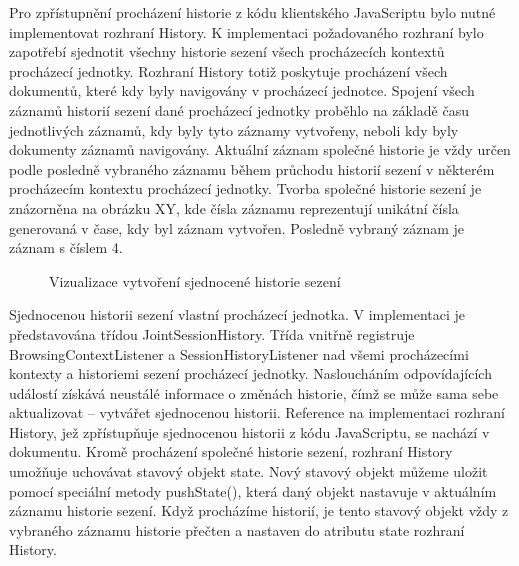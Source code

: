 Pro zpřístupnění procházení historie z kódu klientského JavaScriptu bylo nutné implementovat rozhraní History. K implementaci požadovaného rozhraní bylo zapotřebí sjednotit všechny historie sezení všech procházecích kontextů procházecí jednotky. Rozhraní History totiž poskytuje procházení všech dokumentů, které kdy byly navigovány v procházecí jednotce. Spojení všech záznamů historií sezení dané procházecí jednotky proběhlo na základě času jednotlivých záznamů, kdy byly tyto záznamy vytvořeny, neboli kdy byly dokumenty záznamů navigovány. Aktuální záznam společné historie je vždy určen podle posledně vybraného záznamu během průchodu historií sezení v některém procházecím kontextu procházecí jednotky. Tvorba společné historie sezení je znázorněna na obrázku XY, kde čísla záznamu reprezentují unikátní čísla generovaná v čase, kdy byl záznam vytvořen. Posledně vybraný záznam je záznam s číslem 4.

\begin{figure}[H]
  \begin{center}
    \caption{Vizualizace vytvoření sjednocené historie sezení}
    \label{Figure.SessionHistory}
  \end{center}
\end{figure}

Sjednocenou historii sezení vlastní procházecí jednotka. V implementaci je představována třídou JointSessionHistory. Třída vnitřně registruje BrowsingContextListener a SessionHistoryListener nad všemi procházecími kontexty a historiemi sezení procházecí jednotky. Nasloucháním odpovídajících událostí získává neustálé informace o změnách historie, čímž se může sama sebe aktualizovat -- vytvářet sjednocenou historii. Reference na implementaci rozhraní History, jež zpřístupňuje sjednocenou historii z kódu JavaScriptu, se nachází v dokumentu. Kromě procházení společné historie sezení, rozhraní History umožňuje uchovávat stavový objekt state. Nový stavový objekt můžeme uložit pomocí speciální metody pushState(), která daný objekt nastavuje v aktuálním záznamu historie sezení. Když procházíme historií, je tento stavový objekt vždy z vybraného záznamu historie přečten a nastaven do atributu state rozhraní History.

